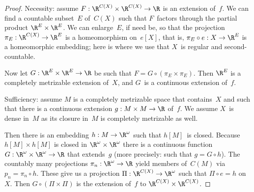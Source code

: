 \documentclass[a4paper]{amsart}
\theoremstyle{plain}
\theoremstyle{definition}
\theoremstyle{remark}
\begin{document}
\begin{proof}
Necessity: assume $F:\R^{C(X)}\times\R^{C(X)}\to\R$ is an extension of~$f$.
We can find a countable subset~$E$ of~$C(X)$ such that $F$~factors through
the partial product $\R^E\times\R^E$. 
We can enlarge~$E$, if need be, so that the projection 
$\pi_E:\R^{C(X)}\to\R^E$ is a homeomorphism on~$e[X]$, that is,
$\pi_E\circ e:X\to\R^E$ is a homeomorphic embedding;
here is where we use that $X$~is regular and second-countable.

Now let $G:\R^E\times\R^E\to\R$ be such that $F=G\circ(\pi_E\times\pi_E)$.
Then $\R^E$ is a completely metrizable extension of~$X$, and $G$~is a 
continuous extension of~$f$.  

\smallskip
Sufficiency: assume $M$ is a completely metrizable space that contains~$X$
and such that there is a continuous extension $g:M\times M\to\R$ of~$f$.
We assume $X$~is dense in~$M$ as its closure in~$M$ is completely metrizable
as well.

Then there is an embedding $h:M\to\R^\omega$ such that $h[M]$~is closed.
Because $h[M]\times h[M]$ is closed in $\R^\omega\times\R^\omega$ there is 
a continuous function~$G:\R^\omega\times\R^\omega\to\R$ that extends~$g$
(more precisely: such that $g=G\circ h$).
The countably many projections $\pi_n:\R^\omega\to\R$ yield members of~$C(M)$
via $p_n=\pi_n\circ h$.
These give us a projection $\Pi:\R^{C(X)}\to\R^\omega$ such that 
$\Pi\circ e=h$ on~$X$.
Then $G\circ(\Pi\times\Pi)$ is the extension of~$f$ 
to $\R^{C(X)}\times\R^{C(X)}$.
\end{proof}
\end{document}
